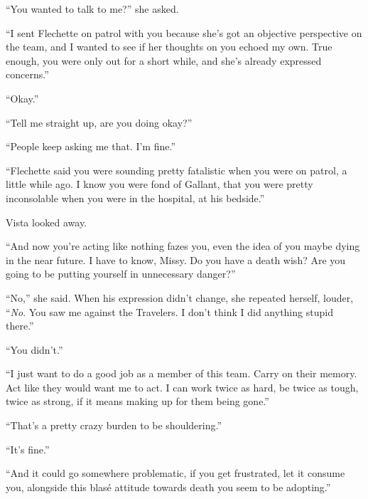 ``You wanted to talk to me?'' she asked.



``I sent Flechette on patrol with you because she's got an objective perspective on the team, and I wanted to see if her thoughts on you echoed my own.  True enough, you were only out for a short while, and she's already expressed concerns.''



``Okay.''



``Tell me straight up, are you doing okay?''



``People keep asking me that.  I'm fine.''



``Flechette said you were sounding pretty fatalistic when you were on patrol, a little while ago.  I know you were fond of Gallant, that you were pretty inconsolable when you were in the hospital, at his bedside.''



Vista looked away.



``And now you're acting like nothing fazes you, even the idea of you maybe dying in the near future.  I have to know, Missy.  Do you have a death wish?  Are you going to be putting yourself in unnecessary danger?''



``No,'' she said.  When his expression didn't change, she repeated herself, louder, ``\emph{No}.  You saw me against the Travelers.  I don't think I did anything stupid there.''



``You didn't.''



``I just want to do a good job as a member of this team.  Carry on their memory.  Act like they would want me to act.  I can work twice as hard, be twice as tough, twice as strong, if it means making up for them being gone.''



``That's a pretty crazy burden to be shouldering.''



``It's fine.''



``And it could go somewhere problematic, if you get frustrated, let it consume you, alongside this blas\'{e} attitude towards death you seem to be adopting.''



